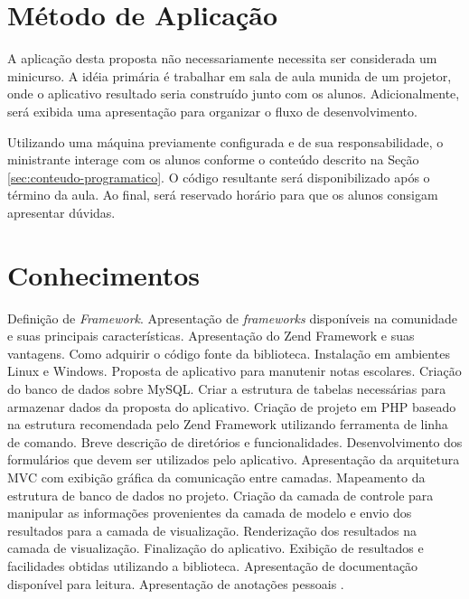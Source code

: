 \documentclass{article}
\begin{document}
\section{Método de Aplicação}
\label{sec:metodo-de-aplicacao}

A aplicação desta proposta não necessariamente necessita ser considerada um
minicurso. A idéia primária é trabalhar em sala de aula munida de um projetor,
onde o aplicativo resultado seria construído junto com os alunos.
Adicionalmente, será exibida uma apresentação para organizar o fluxo de
desenvolvimento.

Utilizando uma máquina previamente configurada e de sua responsabilidade, o
ministrante interage com os alunos conforme o conteúdo descrito na Seção
\ref{sec:conteudo-programatico}. O código resultante será disponibilizado após
o término da aula. Ao final, será reservado horário para que os alunos consigam
apresentar dúvidas.

\section{Conhecimentos}
\label{sec:conhecimentos}

Definição de \emph{Framework}. Apresentação de \emph{frameworks} disponíveis na
comunidade e suas principais características. Apresentação do Zend Framework e
suas vantagens. Como adquirir o código fonte da biblioteca. Instalação em
ambientes Linux e Windows. Proposta de aplicativo para manutenir notas escolares. Criação
do banco de dados sobre MySQL. Criar a estrutura de tabelas necessárias
para armazenar dados da proposta do aplicativo. Criação de projeto em PHP
baseado na estrutura recomendada pelo Zend Framework utilizando ferramenta de
linha de comando. Breve descrição de diretórios e funcionalidades.
Desenvolvimento dos formulários que devem ser utilizados pelo aplicativo.
Apresentação da arquitetura MVC com exibição gráfica da comunicação entre
camadas. Mapeamento da estrutura de banco de dados no projeto. Criação da camada
de controle para manipular as informações provenientes da camada de modelo e
envio dos resultados para a camada de visualização. Renderização dos resultados
na camada de visualização. Finalização do aplicativo. Exibição de resultados e
facilidades obtidas utilizando a biblioteca. Apresentação de documentação
disponível para leitura. Apresentação de anotações pessoais \cite{wanderson}.



\end{document}

